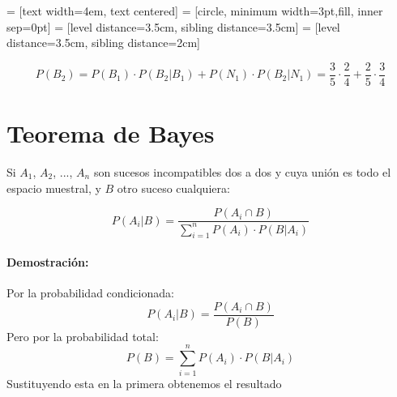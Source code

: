 \documentclass[a4paper,spanish,9pt]{extarticle}
\begin{document}
\begin{multicols*}{2}
 = [text width=4em, text centered]
 = [circle, minimum width=3pt,fill, inner sep=0pt]
 = [level distance=3.5cm, sibling distance=3.5cm]
 = [level distance=3.5cm, sibling distance=2cm]
$$P(B_2)=P(B_1)\cdot P(B_2|B_1) + P(N_1)\cdot P(B_2|N_1)
= \frac{3}{5}\cdot\frac{2}{4} + \frac{2}{5}\cdot\frac{3}{4}$$

\section{Teorema de Bayes}

Si $A_1$, $A_2$, ..., $A_n$   son sucesos incompatibles dos a dos y cuya unión es todo el espacio muestral, y $B$ otro suceso cualquiera:

$$P(A_i|B)=\dfrac{P(A_i \cap B)}{\sum_{i=1}^n P(A_i)\cdot  P(B|A_i)} $$

\paragraph{Demostración:} Por la probabilidad condicionada:
$$P(A_i|B)=\dfrac{P(A_i \cap B)}{P(B)} $$
Pero por la probabilidad total:
$$P(B)=\sum_{i=1}^n P(A_i)\cdot  P(B|A_i)$$
Sustituyendo esta en la primera obtenemos el resultado

\end{multicols*}
\end{document}
